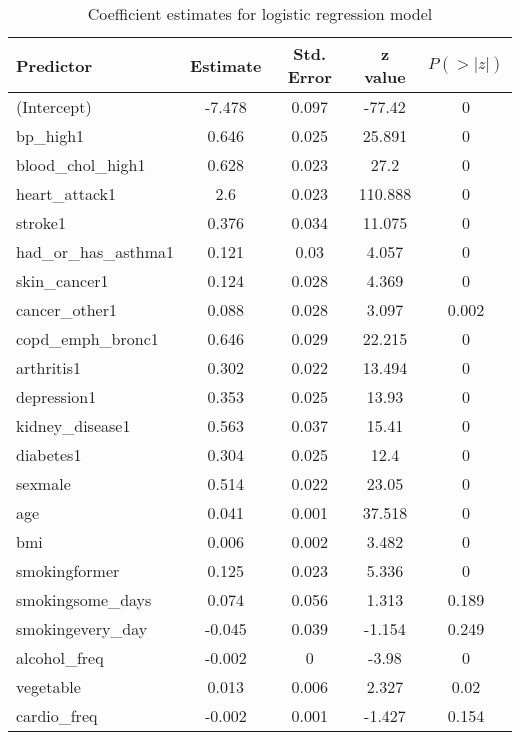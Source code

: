\documentclass[12pt]{article}
\begin{document}
\begin{table}[!ht]
    \centering
    \begin{tabular}{l|c|c|c|c}
        \hline Predictor & Estimate & Std. Error & z value & $P(>|z|)$ \\ \hline
        (Intercept) & -7.478 & 0.097 & -77.42 & 0 \\ 
        bp\_high1 & 0.646 & 0.025 & 25.891 & 0 \\ 
        blood\_chol\_high1 & 0.628 & 0.023 & 27.2 & 0 \\ 
        heart\_attack1 & 2.6 & 0.023 & 110.888 & 0 \\ 
        stroke1 & 0.376 & 0.034 & 11.075 & 0 \\ 
        had\_or\_has\_asthma1 & 0.121 & 0.03 & 4.057 & 0 \\ 
        skin\_cancer1 & 0.124 & 0.028 & 4.369 & 0 \\ 
        cancer\_other1 & 0.088 & 0.028 & 3.097 & 0.002 \\ 
        copd\_emph\_bronc1 & 0.646 & 0.029 & 22.215 & 0 \\ 
        arthritis1 & 0.302 & 0.022 & 13.494 & 0 \\ 
        depression1 & 0.353 & 0.025 & 13.93 & 0 \\ 
        kidney\_disease1 & 0.563 & 0.037 & 15.41 & 0 \\ 
        diabetes1 & 0.304 & 0.025 & 12.4 & 0 \\ 
        sexmale & 0.514 & 0.022 & 23.05 & 0 \\ 
        age & 0.041 & 0.001 & 37.518 & 0 \\ 
        bmi & 0.006 & 0.002 & 3.482 & 0 \\ 
        smokingformer & 0.125 & 0.023 & 5.336 & 0 \\ 
        smokingsome\_days & 0.074 & 0.056 & 1.313 & 0.189 \\ 
        smokingevery\_day & -0.045 & 0.039 & -1.154 & 0.249 \\ 
        alcohol\_freq & -0.002 & 0 & -3.98 & 0 \\ 
        vegetable & 0.013 & 0.006 & 2.327 & 0.02 \\ 
        cardio\_freq & -0.002 & 0.001 & -1.427 & 0.154 \\ \hline
    \end{tabular}
    \caption{Coefficient estimates for logistic regression model}
    \label{logcoef}
\end{table}
\end{document}
